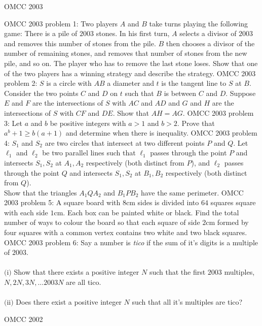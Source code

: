 OMCC 2003 

OMCC 2003 problem 1:  Two players $A$ and $B$ take turns playing the following game: There is a pile of $2003$ stones. In his first turn, $A$ selects a divisor of $2003$ and removes this number of stones from the pile. $B$ then chooses a divisor of the number of remaining stones, and removes that number of stones from the new pile, and so on. The player who has to remove the last stone loses. Show that one of the two players has a winning strategy and describe the strategy. 
OMCC 2003 problem 2:  $S$ is a circle with $AB$ a diameter and $t$ is the tangent line to $S$ at $B$. Consider the two points $C$ and $D$ on $t$ such that $B$ is between $C$ and $D$. Suppose $E$ and $F$ are the intersections of $S$ with $AC$ and $AD$ and $G$ and $H$ are the intersections of $S$ with $CF$ and $DE$. Show that $AH=AG$. 
OMCC 2003 problem 3:  Let $a$ and $b$ be positive integers with $a>1$ and $b>2$. Prove that $a^b+1\ge b(a+1)$ and determine when there is inequality. 
OMCC 2003 problem 4:  $S_1$ and $S_2$ are two circles that intersect at two different points $P$ and $Q$. Let $\ell_1$ and $\ell_2$ be two parallel lines such that $\ell_1$ passes through the point $P$ and intersects $S_1,S_2$ at $A_1,A_2$ respectively (both distinct from $P$), and $\ell_2$ passes through the point $Q$ and intersects $S_1,S_2$ at $B_1,B_2$ respectively (both distinct from $Q$). \\
Show that the triangles $A_1QA_2$ and $B_1PB_2$ have the same perimeter. 
OMCC 2003 problem 5:  A square board with $8\text{cm}$ sides is divided into $64$ squares square with each side $1\text{cm}$. Each box can be painted white or black. Find the total number of ways to colour the board so that each square of side $2\text{cm}$ formed by four squares with a common vertex contains two white and two black squares. 
OMCC 2003 problem 6:  Say a number is \textit{tico} if the sum of it's digits is a multiple of $2003$. \\\\
$\text{(i)}$ Show that there exists a positive integer $N$ such that the first $2003$ multiples, $N,2N,3N,\ldots 2003N$ are all tico. \\\\
$\text{(ii)}$ Does there exist a positive integer $N$ such that all it's multiples are tico? 

OMCC 2002 

